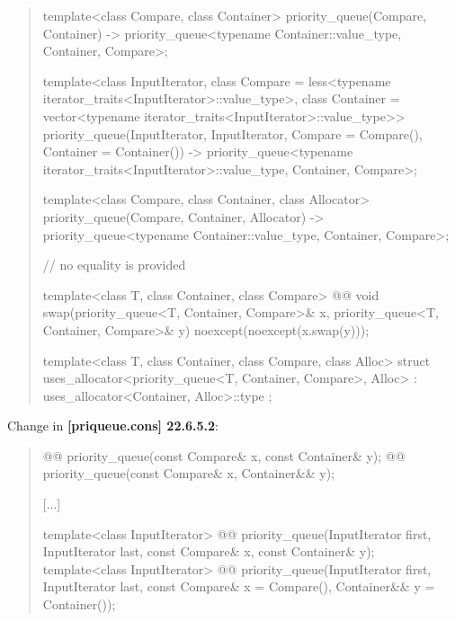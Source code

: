 \documentclass{wg21}
\begin{document}
\begin{quote}
\begin{codeblock}
{  template<class Compare, class Container>
    priority_queue(Compare, Container)
      -> priority_queue<typename Container::value_type, Container, Compare>;
  
  template<class InputIterator,
           class Compare = less<typename iterator_traits<InputIterator>::value_type>,
           class Container = vector<typename iterator_traits<InputIterator>::value_type>>
    priority_queue(InputIterator, InputIterator, Compare = Compare(), Container = Container())
      -> priority_queue<typename iterator_traits<InputIterator>::value_type, Container, Compare>;
  
  template<class Compare, class Container, class Allocator>
    priority_queue(Compare, Container, Allocator)
      -> priority_queue<typename Container::value_type, Container, Compare>;
  
  // no equality is provided
  
  template<class T, class Container, class Compare>
    @@ void swap(priority_queue<T, Container, Compare>& x,
      priority_queue<T, Container, Compare>& y) noexcept(noexcept(x.swap(y)));
  
  template<class T, class Container, class Compare, class Alloc>
    struct uses_allocator<priority_queue<T, Container, Compare>, Alloc>
      : uses_allocator<Container, Alloc>::type { };
}
\end{codeblock}%
\end{quote}

Change in \textbf{[priqueue.cons] 22.6.5.2}:
\begin{quote}
\begin{itemdecl}
@@ priority_queue(const Compare& x, const Container& y);
@@ priority_queue(const Compare& x, Container&& y);
\end{itemdecl}
[...]
\begin{itemdecl}
template<class InputIterator>
  @@ priority_queue(InputIterator first, InputIterator last,
                           const Compare& x, const Container& y);
template<class InputIterator>
  @@ priority_queue(InputIterator first, InputIterator last,
                           const Compare& x = Compare(), Container&& y = Container());
\end{itemdecl}
\end{quote}
\end{document}
